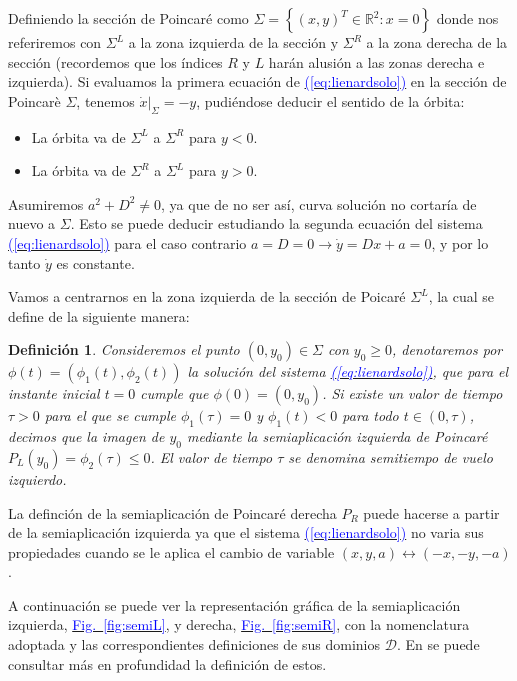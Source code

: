 \documentclass[12pt,a4paper]{report} %
\newtheorem{definicion}{Definición}[chapter]
\newtheorem{definicion}{Definición}[chapter] %
\newcommand{\fref}[1]{\hyperref[#1]{\textcolor{blue}{Fig.~\ref*{#1}}}}
\newcommand{\eref}[1]{\hyperref[#1]{\textcolor{blue}{(\ref*{#1})}}}
\newcommand{\fref}[1]{\hyperref[#1]{\textcolor{blue}{\textit{Fig.~\ref*{#1}}}}}
\newcommand{\eref}[1]{\hyperref[#1]{\textcolor{blue}{\textit{(\ref*{#1})}}}}
\begin{document}
	Definiendo la sección de Poincaré como $\varSigma=\left\{(x,y)^T\in \mathbb{R}^2:x=0\right\}$ donde nos referiremos con $\varSigma^L$ a la zona izquierda de la sección y $\varSigma^R$ a la zona derecha de la sección (recordemos que los índices $R$ y $L$ harán alusión a las zonas derecha e izquierda). Si evaluamos la primera ecuación de \eref{eq:lienardsolo} en la sección de Poincarè $\varSigma$, tenemos $\dot{x}|_{\varSigma}=-y$, pudiéndose deducir el sentido de la órbita:
	
	\begin{itemize}
		\item La órbita va de $\varSigma^L$ a $\varSigma^R$ para $y<0$.
		\item La órbita va de $\varSigma^R$ a $\varSigma^L$ para $y>0$.
	\end{itemize}
	
	Asumiremos $a^2+D^2\neq0$, ya que de no ser así, curva solución no cortaría de nuevo a $\varSigma$. Esto se puede deducir estudiando la segunda ecuación del sistema \eref{eq:lienardsolo} para el caso contrario $a=D=0 \longrightarrow \dot{y}=Dx+a=0$, y por lo tanto $\dot{y}$ es constante.
	
	\vspace{0.5cm}Vamos a centrarnos en la zona izquierda de la sección de Poicaré $\varSigma^L$, la cual se define de la siguiente manera:

	\vspace{0.5cm}
	\begin{definicion}
		\label{def6}
		Consideremos el punto $(0,y_0)\in \varSigma$ con $y_0\geq0$, denotaremos por $\phi(t)=(\phi_1(t),\phi_2(t))$ la solución del sistema \eref{eq:lienardsolo}, que para el instante inicial $t=0$ cumple que $\phi(0)=(0,y_0)$. Si existe un valor de tiempo $\tau>0$ para el que se cumple $\phi_1(\tau)=0$ y $\phi_1(t)<0$ para todo $t\in(0,\tau)$, decimos que la imagen de $y_0$ mediante la semiaplicación izquierda de Poincaré $P_L(y_0)=\phi_2(\tau)\leq0$. El valor de tiempo $\tau$ se denomina semitiempo de vuelo izquierdo.
	\end{definicion}
	
	\vspace{0.5cm}La definción de la semiaplicación de Poincaré derecha $P_R$ puede hacerse a partir de la semiaplicación izquierda ya que el sistema \eref{eq:lienardsolo} no varia sus propiedades cuando se le aplica el cambio de variable $(x,y,a)\longleftrightarrow(-x,-y,-a)$.
	
	\newpage
	
	\vspace{0.5cm} A continuación se puede ver la representación gráfica de la semiaplicación izquierda, \fref{fig:semiL}, y derecha, \fref{fig:semiR}, con la nomenclatura adoptada y las correspondientes definiciones de sus dominios $\mathcal{D}$. En \cite{caracterizacion} se puede consultar más en profundidad la definición de estos.
\end{document}
